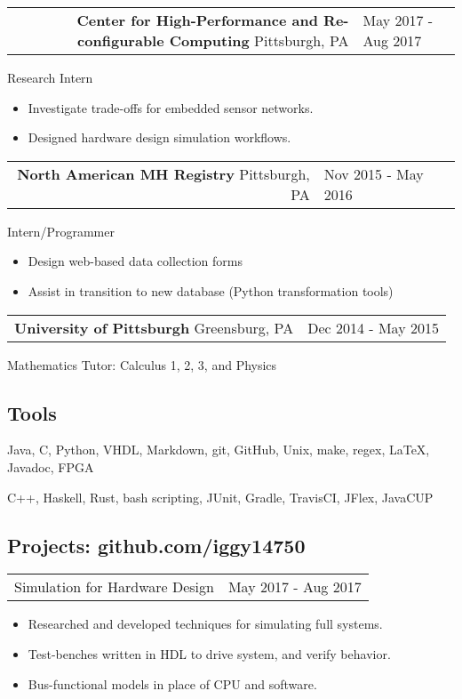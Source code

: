 \documentclass[18pt]{article}
\makeatletter
\providecommand{\tightlist}{
    \setlength{\itemsep}{0pt}\setlength{\parskip}{0pt}
}
\providecommand{\datetable}[2]{
    \begin{tabular*}{\textwidth}{r @{\extracolsep{\fill}} l}
        #1 & #2
    \end{tabular*}
}
\makeatother
\begin{document}
        \datetable{
            \textbf{Center for High-Performance and Re-configurable Computing} \textbar{} Pittsburgh, PA
        }{May 2017 - Aug 2017}
        Research Intern
        \begin{itemize}\tightlist
          \item Investigate trade-offs for embedded sensor networks.
          \item Designed hardware design simulation workflows.
      	\end{itemize}
      
        \datetable{
            \textbf{North American MH Registry} 
            \textbar{} Pittsburgh, PA
        }{Nov 2015 - May 2016}
        Intern/Programmer
        \begin{itemize}\tightlist
          \item Design web-based data collection forms
          \item Assist in transition to new database (Python transformation tools)
        \end{itemize}

        \datetable{
            \textbf{University of Pittsburgh} \textbar{} 
            Greensburg, PA
        }{Dec 2014 - May 2015}
        Mathematics Tutor: Calculus 1, 2, 3, and Physics
      
  \subsection*{Tools}\label{languages}
  \begin{description}\tightlist
      \item[Proficient:] Java,
      C,
      Python,
      VHDL,
      Markdown,
      git,
      GitHub,
      Unix,
      make,
      regex,
      \LaTeX,
      Javadoc,
      FPGA
      \item[Learning:] C++, 
      Haskell, 
      Rust,
      bash scripting,      
      JUnit, 
      Gradle,
      TravisCI,
      JFlex,
      JavaCUP
  \end{description}


    \subsection*{Projects: github.com/iggy14750}\label{projects}
        
        \datetable{Simulation for Hardware Design}{May 2017 - Aug 2017}
        \begin{itemize}\tightlist
            \item Researched and developed techniques for simulating full systems.
            \item Test-benches written in HDL to drive system, and verify behavior.
            \item Bus-functional models in place of CPU and software.
        \end{itemize}
        
\end{document}
